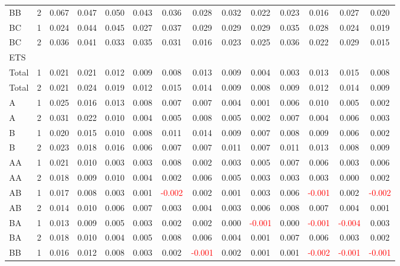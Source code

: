 \begin{table}[H]
{\begin{tabular}{llcccccccccccc}
BB & 2 & 0.067 & 0.047 & 0.050 & 0.043 & 0.036 & 0.028 & 0.032 & 0.022 & 0.023 & 0.016 & 0.027 & 0.020\\
BC & 1 & 0.024 & 0.044 & 0.045 & 0.027 & 0.037 & 0.029 & 0.029 & 0.029 & 0.035 & 0.028 & 0.024 & 0.019\\
BC & 2 & 0.036 & 0.041 & 0.033 & 0.035 & 0.031 & 0.016 & 0.023 & 0.025 & 0.036 & 0.022 & 0.029 & 0.015\\
\hline
ETS &  &  &  &  &  &  &  &  &  &  &  &  & \\
\hline
Total & 1 & 0.021 & 0.021 & 0.012 & 0.009 & 0.008 & 0.013 & 0.009 & 0.004 & 0.003 & 0.013 & 0.015 & 0.008\\
Total & 2 & 0.021 & 0.024 & 0.019 & 0.012 & 0.015 & 0.014 & 0.009 & 0.008 & 0.009 & 0.012 & 0.014 & 0.009\\
A & 1 & 0.025 & 0.016 & 0.013 & 0.008 & 0.007 & 0.007 & 0.004 & 0.001 & 0.006 & 0.010 & 0.005 & 0.002\\
A & 2 & 0.031 & 0.022 & 0.010 & 0.004 & 0.005 & 0.008 & 0.005 & 0.002 & 0.007 & 0.004 & 0.006 & 0.003\\
B & 1 & 0.020 & 0.015 & 0.010 & 0.008 & 0.011 & 0.014 & 0.009 & 0.007 & 0.008 & 0.009 & 0.006 & 0.002\\
B & 2 & 0.023 & 0.018 & 0.016 & 0.006 & 0.007 & 0.007 & 0.011 & 0.007 & 0.011 & 0.013 & 0.008 & 0.009\\
AA & 1 & 0.021 & 0.010 & 0.003 & 0.003 & 0.008 & 0.002 & 0.003 & 0.005 & 0.007 & 0.006 & 0.003 & 0.006\\
AA & 2 & 0.018 & 0.009 & 0.010 & 0.004 & 0.002 & 0.006 & 0.005 & 0.003 & 0.003 & 0.003 & 0.000 & 0.002\\
AB & 1 & 0.017 & 0.008 & 0.003 & 0.001 & \textcolor{red}{-0.002} & 0.002 & 0.001 & 0.003 & 0.006 & \textcolor{red}{-0.001} & 0.002 & \textcolor{red}{-0.002}\\
AB & 2 & 0.014 & 0.010 & 0.006 & 0.007 & 0.003 & 0.004 & 0.003 & 0.006 & 0.008 & 0.007 & 0.004 & 0.001\\
BA & 1 & 0.013 & 0.009 & 0.005 & 0.003 & 0.002 & 0.002 & 0.000 & \textcolor{red}{-0.001} & 0.000 & \textcolor{red}{-0.001} & \textcolor{red}{-0.004} & 0.003\\
BA & 2 & 0.018 & 0.010 & 0.004 & 0.005 & 0.008 & 0.006 & 0.004 & 0.001 & 0.007 & 0.006 & 0.003 & 0.002\\
BB & 1 & 0.016 & 0.012 & 0.008 & 0.003 & 0.002 & \textcolor{red}{-0.001} & 0.002 & 0.001 & 0.001 & \textcolor{red}{-0.002} & \textcolor{red}{-0.001} & \textcolor{red}{-0.001}\\

\end{tabular}}
\end{table}
